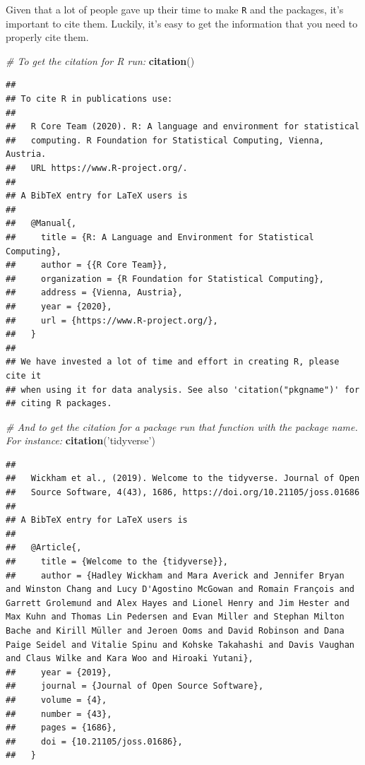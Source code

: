 \documentclass[
]{book}
\newenvironment{Shaded}{\begin{snugshade}}{\end{snugshade}}
\newcommand{\CommentTok}[1]{\textcolor[rgb]{0.56,0.35,0.01}{\textit{#1}}}
\newcommand{\KeywordTok}[1]{\textcolor[rgb]{0.13,0.29,0.53}{\textbf{#1}}}
\newcommand{\NormalTok}[1]{#1}
\newcommand{\StringTok}[1]{\textcolor[rgb]{0.31,0.60,0.02}{#1}}
\begin{document}
Given that a lot of people gave up their time to make \texttt{R} and the packages, it's important to cite them. Luckily, it's easy to get the information that you need to properly cite them.

\begin{Shaded}
\begin{Highlighting}[]
\CommentTok{# To get the citation for R run:}
\KeywordTok{citation}\NormalTok{()}
\end{Highlighting}
\end{Shaded}

\begin{verbatim}
## 
## To cite R in publications use:
## 
##   R Core Team (2020). R: A language and environment for statistical
##   computing. R Foundation for Statistical Computing, Vienna, Austria.
##   URL https://www.R-project.org/.
## 
## A BibTeX entry for LaTeX users is
## 
##   @Manual{,
##     title = {R: A Language and Environment for Statistical Computing},
##     author = {{R Core Team}},
##     organization = {R Foundation for Statistical Computing},
##     address = {Vienna, Austria},
##     year = {2020},
##     url = {https://www.R-project.org/},
##   }
## 
## We have invested a lot of time and effort in creating R, please cite it
## when using it for data analysis. See also 'citation("pkgname")' for
## citing R packages.
\end{verbatim}

\begin{Shaded}
\begin{Highlighting}[]
\CommentTok{# And to get the citation for a package run that function with the package name. For instance:}
\KeywordTok{citation}\NormalTok{(}\StringTok{'tidyverse'}\NormalTok{)}
\end{Highlighting}
\end{Shaded}

\begin{verbatim}
## 
##   Wickham et al., (2019). Welcome to the tidyverse. Journal of Open
##   Source Software, 4(43), 1686, https://doi.org/10.21105/joss.01686
## 
## A BibTeX entry for LaTeX users is
## 
##   @Article{,
##     title = {Welcome to the {tidyverse}},
##     author = {Hadley Wickham and Mara Averick and Jennifer Bryan and Winston Chang and Lucy D'Agostino McGowan and Romain François and Garrett Grolemund and Alex Hayes and Lionel Henry and Jim Hester and Max Kuhn and Thomas Lin Pedersen and Evan Miller and Stephan Milton Bache and Kirill Müller and Jeroen Ooms and David Robinson and Dana Paige Seidel and Vitalie Spinu and Kohske Takahashi and Davis Vaughan and Claus Wilke and Kara Woo and Hiroaki Yutani},
##     year = {2019},
##     journal = {Journal of Open Source Software},
##     volume = {4},
##     number = {43},
##     pages = {1686},
##     doi = {10.21105/joss.01686},
##   }
\end{verbatim}
\end{document}

